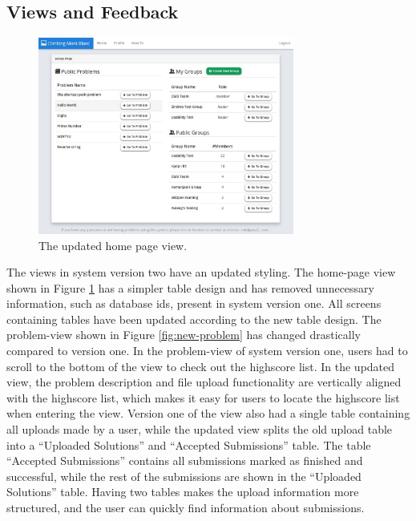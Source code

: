 \subsection{Views and Feedback}
\label{sub-sec:impr-views-feedback}
\begin{figure}[b!]
    \centering
    \includegraphics[width=0.75\textwidth]{figs/new_homepage.jpg}
    \caption[The updated home page view]{The updated home page view.}
    \label{fig:new-homepage}
\end{figure}
The views in system version two have an updated styling. The home-page view shown in Figure \ref{fig:new-homepage} has a simpler table design and has removed unnecessary information, such as database ids, present in system version one. All screens containing tables have been updated according to the new table design. The problem-view shown in Figure \ref{fig:new-problem} has changed drastically compared to version one. In the problem-view of system version one, users had to scroll to the bottom of the view to check out the highscore list. In the updated view, the problem description and file upload functionality are vertically aligned with the highscore list, which makes it easy for users to locate the highscore list when entering the view. Version one of the view also had a single table containing all uploads made by a user, while the updated view splits the old upload table into a “Uploaded Solutions” and “Accepted Submissions” table. The table “Accepted Submissions” contains all submissions marked as finished and successful, while the rest of the submissions are shown in the “Uploaded Solutions” table. Having two tables makes the upload information more structured, and the user can quickly find information about submissions. \\

